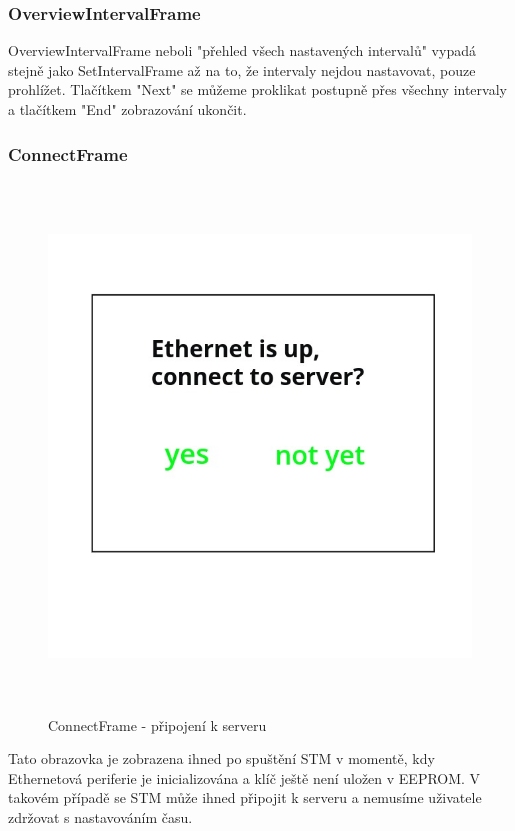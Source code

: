 \subsubsection{OverviewIntervalFrame}
OverviewIntervalFrame neboli "přehled všech nastavených intervalů" vypadá stejně jako SetIntervalFrame
až na to, že intervaly nejdou nastavovat, pouze prohlížet.
Tlačítkem "Next" se můžeme proklikat postupně přes všechny intervaly a tlačítkem "End" zobrazování
ukončit.

\subsubsection{ConnectFrame}
\begin{figure}[p]\centering
\includegraphics[width=140mm, height=140mm]{../img/connect_frame.jpg}
\caption{ConnectFrame - připojení k serveru}
\label{connect-frame}
\end{figure}

Tato obrazovka je zobrazena ihned po spuštění STM v momentě, kdy Ethernetová periferie je inicializována
a klíč ještě není uložen v EEPROM.
V takovém případě se STM může ihned připojit k serveru a nemusíme uživatele zdržovat s nastavováním
času.


